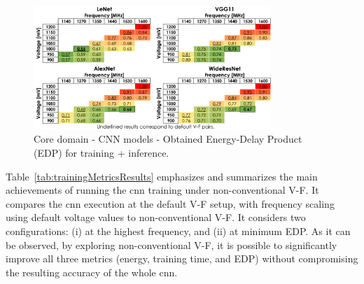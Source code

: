 \begin{figure}[!htb]
    \centering
        \includegraphics[width=0.8\textwidth]{Figures/Application To Deep Learning/CNN_EDP.pdf}
        \caption{Core domain - CNN models - Obtained Energy-Delay Product (EDP) for training + inference.}
    \label{fig:CNN_EDP_training_inf}
\end{figure}

Table~\ref{tab:trainingMetricsResults} emphasizes and summarizes the main achievements of running the \acrshort{cnn} training under non-conventional V-F. It compares the \acrshort{cnn} execution at the default V-F setup, with frequency scaling using default voltage values to non-conventional V-F. It considers two configurations: (i) at the highest frequency, and (ii) at minimum EDP. As it can be observed, by exploring non-conventional V-F, it is possible to significantly improve all three metrics (energy, training time, and EDP) without compromising the resulting accuracy of the whole \acrshort{cnn}. 

